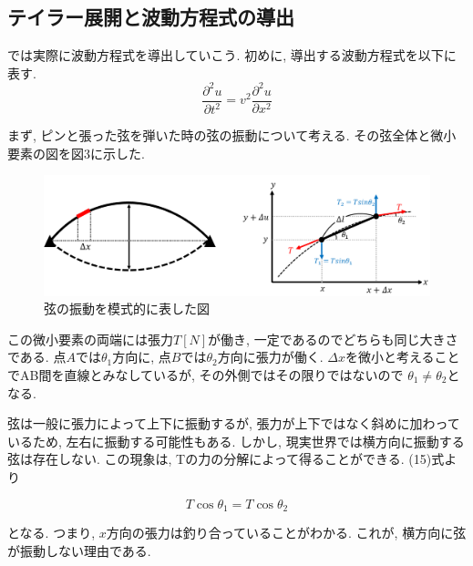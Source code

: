 \documentclass{ltjsarticle}
\begin{document}
\subsection*{テイラー展開と波動方程式の導出}
では実際に波動方程式を導出していこう. 
初めに, 導出する波動方程式を以下に表す. 
\begin{equation}
  \frac{\partial^2 u}{\partial t^2}=v^2 \frac{\partial^2 u}{\partial x^2}
\end{equation}

まず, ピンと張った弦を弾いた時の弦の振動について考える. 
その弦全体と微小要素の図を図3に示した. 
\begin{figure}[htbp]
  \centering
  \includegraphics[width=1\textwidth]{img/弦の振動.png}
  \caption{弦の振動を模式的に表した図}
\end{figure}
この微小要素の両端には張力$T[N]$が働き, 一定であるのでどちらも同じ大きさである. 
点$A$では$\theta_1$方向に, 点$B$では$\theta_2$方向に張力が働く. 
$\Delta x$を微小と考えることでAB間を直線とみなしているが, その外側ではその限りではないので
$\theta_1 \neq \theta_2$となる.

弦は一般に張力によって上下に振動するが, 張力が上下ではなく斜めに加わっているため, 左右に振動する可能性もある. 
しかし, 現実世界では横方向に振動する弦は存在しない. この現象は, Tの力の分解によって得ることができる. 
(15)式より

\begin{equation}
  T \cos θ_1 = T \cos θ_2
\end{equation}

となる. つまり, $x$方向の張力は釣り合っていることがわかる. 
これが, 横方向に弦が振動しない理由である. 
\end{document}
